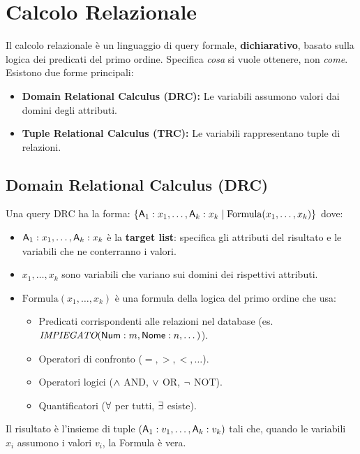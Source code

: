 	\section{Calcolo Relazionale}
	Il calcolo relazionale è un linguaggio di query formale, \textbf{dichiarativo}, basato sulla logica dei predicati del primo ordine. Specifica \textit{cosa} si vuole ottenere, non \textit{come}.
	Esistono due forme principali:
	\begin{itemize}
		\item \textbf{Domain Relational Calculus (DRC):} Le variabili assumono valori dai domini degli attributi.
		\item \textbf{Tuple Relational Calculus (TRC):} Le variabili rappresentano tuple di relazioni.
	\end{itemize}
	
	\subsection{Domain Relational Calculus (DRC)}
	Una query DRC ha la forma:
	$\{ \textsf{A}_1:x_1, \dots, \textsf{A}_k:x_k \mid \text{Formula}(x_1, \dots, x_k) \}$
	dove:
	\begin{itemize}
		\item $\textsf{A}_1:x_1, \dots, \textsf{A}_k:x_k$ è la \textbf{target list}: specifica gli attributi del risultato e le variabili che ne conterranno i valori.
		\item $x_1, \dots, x_k$ sono variabili che variano sui domini dei rispettivi attributi.
		\item $\text{Formula}(x_1, \dots, x_k)$ è una formula della logica del primo ordine che usa:
		\begin{itemize}
			\item Predicati corrispondenti alle relazioni nel database (es. $\textit{IMPIEGATO}(\textsf{Num}:m, \textsf{Nome}:n, \dots)$).
			\item Operatori di confronto ($=, >, <, \dots$).
			\item Operatori logici ($\wedge$ AND, $\vee$ OR, $\neg$ NOT).
			\item Quantificatori ($\forall$ per tutti, $\exists$ esiste).
		\end{itemize}
	\end{itemize}
	Il risultato è l'insieme di tuple $(\textsf{A}_1:v_1, \dots, \textsf{A}_k:v_k)$ tali che, quando le variabili $x_i$ assumono i valori $v_i$, la Formula è vera.
	
